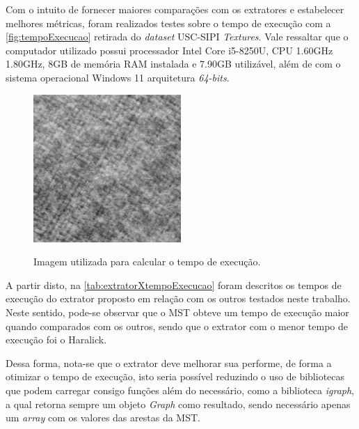 \par Com o intuito de fornecer maiores comparações com os extratores e estabelecer melhores métricas, foram realizados testes sobre o tempo de execução com a \autoref{fig:tempoExecucao} retirada do \textit{dataset} USC-SIPI \textit{Textures}. Vale ressaltar que o computador utilizado possui processador Intel Core i5-8250U, CPU 1.60GHz 1.80GHz, 8GB de memória RAM instalada e 7.90GB utilizável, além de com o sistema operacional Windows 11 arquitetura \textit{64-bits}.

\pagebreak 

\begin{figure}[!h]
    \centering
    \caption{Imagem utilizada para calcular o tempo de execução.}
    \includegraphics[width=0.5\textwidth]{./dados/figuras/testeExecucao.png}
    \label{fig:tempoExecucao}
\end{figure}

\par A partir disto, na \autoref{tab:extratorXtempoExecucao} foram descritos os tempos de execução do extrator proposto em relação com os outros testados neste trabalho. Neste sentido, pode-se observar que o MST obteve um tempo de execução maior quando comparados com os outros, sendo que o extrator com o menor tempo de execução foi o Haralick. 



\par Dessa forma, nota-se que o extrator deve melhorar sua performe, de forma a otimizar o tempo de execução, isto seria possível reduzindo o uso de bibliotecas que podem carregar consigo funções além do necessário, como a biblioteca \textit{igraph}, a qual retorna sempre um objeto \textit{Graph} como resultado, sendo necessário apenas um \textit{array} com os valores das arestas da MST.

